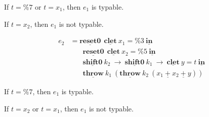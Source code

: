 \documentclass[10pt,a4j]{jarticle}
\newcommand\cResetz{\underline{\textbf{reset0}}}
\newcommand\cShiftz{\underline{\textbf{shift0}}}
\newcommand\cThrow{\underline{\textbf{throw}}}
\newcommand\cPlus{\underline{\textbf{+}}}
\newcommand\cLet{\underline{\textbf{clet}}}
\newcommand\cIn{\underline{\textbf{in}}}
\newcommand\csp[1]{\texttt{\%}{#1}}
\begin{document}
If $t=\csp{7}$ or $t=x_1$, then $e_1$ is typable.

If $t=x_2$, then $e_1$ is not typable.

\begin{align*}
  e_2 & = \cResetz ~~\cLet~x_1=\csp{3}~\cIn \\
      & \phantom{=}~~ \cResetz ~~\cLet~x_2=\csp{5}~\cIn \\
      & \phantom{=}~~ \cShiftz~k_2~\to~ \cShiftz~k_1~\to~ \cLet~y=t~\cIn \\
      & \phantom{=}~~ \cThrow~k_1~(\cThrow~k_2~(x_1~\cPlus~x_2~\cPlus~y))
\end{align*}

If $t=\csp{7}$, then $e_1$ is typable.

If $t=x_2$ or $t=x_1$, then $e_1$ is not typable.
\end{document}

